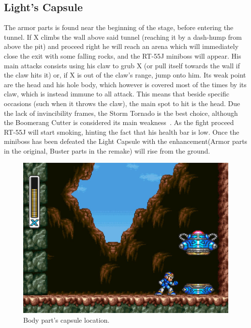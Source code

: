 \subsection{Light's Capsule}
The armor parts is found near the beginning of the stage, before entering the tunnel. If X climbs the wall above said tunnel (reaching it by a dash-hump from above the pit) and proceed right he will reach an arena which will immediately close the exit with some falling rocks, and the RT-55J miniboss will appear. His main attacks consists using his claw to grub X (or pull itself towards the wall if the claw hits it) or, if X is out of the claw's range, jump onto him. Its weak point are the head and his hole body, which however is covered most of the times by its claw, which is instead immune to all attack. This means that beside specific occasions (such when it throws the claw), the main spot to hit is the head. Due the lack of invincibility frames, the Storm Tornado is the best choice, although the Boomerang Cutter is considered its main weakness~\cite{wiki:RT55J}. As the fight proceed RT-55J will start smoking, hinting the fact that his health bar is low. Once the miniboss has been defeated the Light Capsule with the enhancement(Armor parts in the original, Buster parts in the remake) will rise from the ground.
\begin{figure}[htp]
	\centering
	\includegraphics[width=0.5\linewidth]{figures/X1/Sting_chameleon/Sting_armor_capsule.jpg}
	\caption{Body part's capsule location.}
\end{figure}

